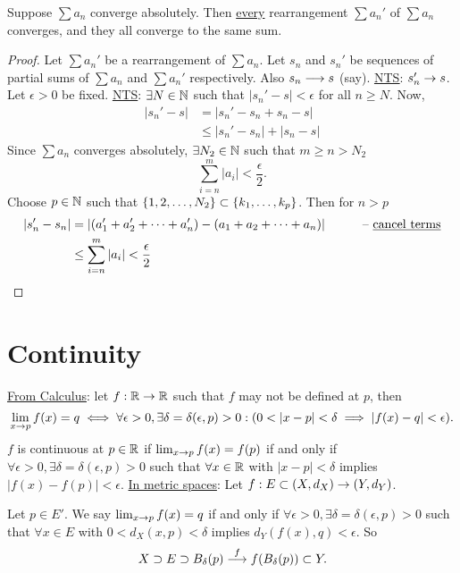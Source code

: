 \documentclass[]{article}
\begin{document}
\begin{theorem}
	Suppose $\sum a_n$ converge absolutely.
	Then \ul{every} rearrangement $\sum a_n'$ of $\sum a_n$ converges, and they all converge to the same sum.
\end{theorem}
\begin{proof}
	Let $\sum a_n'$ be a rearrangement of $\sum a_n$.
	Let $s_n$ and $s_n'$ be sequences of partial sums of $\sum a_n$ and $\sum a_n'$ respectively.
	Also $s_n\longrightarrow s$ (say). \ul{\ul{NTS}}: $s_n'\rightarrow s$.
	Let $\epsilon>0$ be fixed.
	\ul{NTS}: $\exists N\in\mathbb{N}$ such that $|s_n'-s|<\epsilon$ for all $n\geq N$.
	Now, 
	\begin{align*}
		|s_n'-s|&=|s_n'-s_n+s_n-s| \\
				&\leq |s_n'-s_n|+|s_n-s|
	\end{align*}
	Since $\sum a_n$ converges absolutely, $\exists N_2\in\mathbb{N}$ such that $m\geq n>N_2$
	$$\sum_{i=n}^m |a_i| < \frac\epsilon2.$$
	Choose $p\in\mathbb{N}$ such that $\left\{ 1,2,\dots,N_2 \right\}\subset\left\{ k_1,\dots,k_p \right\}$.
	Then for $n>p$
	\begin{align*}
		|s_n'-s_n| &= |(a_1'+a_2'+\dots+a_n')-(a_1+a_2+\dots+a_n)| &\qquad \text{-- \underline{cancel terms}} \\
				  &\leq \sum_{i=n}^{m} |a_i| < \frac\epsilon2
	\end{align*}
\end{proof}

\section*{Continuity}

\ul{From Calculus}: let $f:\mathbb{R}\rightarrow\mathbb{R}$ such that $f$ may not be  defined at $p$, then $$\lim_{x\ra p} f(x) = q \iff \forall\epsilon>0,\exists \delta=\delta(\epsilon,p)>0: (0<|x-p|<\delta \implies |f(x)-q|<\epsilon).$$
$f$ is continuous at $p\in\mathbb{R}$ if $\lim_{x\rightarrow p} f(x) = f(p)$ if and only if $\forall\epsilon>0,\exists\delta=\delta(\epsilon,p)>0$ such that $\forall x\in\mathbb{R}$ with $|x-p|<\delta$ implies $|f(x)-f(p)|<\epsilon$.
\ul{In metric spaces}: Let $f:E\subset(X,d_X)\rightarrow(Y,d_Y)$.
\begin{definition}
	[Limit] Let $p\in E'$. We say $\lim_{x\rightarrow p} f(x) = q$ if and only if $\forall \epsilon>0,\exists\delta=\delta(\epsilon,p)>0$ such that $\forall x\in E$ with $0<d_X(x,p)<\delta$ implies $d_Y(f(x),q) < \epsilon$.
	So $$X\supset E\supset B_\delta(p) \overset{f}{\longrightarrow} f(B_\delta(p))\subset Y.$$
\end{definition}
\end{document}
